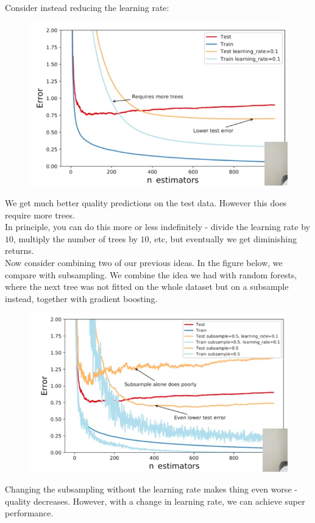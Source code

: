 \begin{frameex}
\newpage
Consider instead reducing the learning rate:
\begin{figure}[H]
\centering
\includegraphics[scale=0.4]{testtrainlearningrate.png}
\end{figure}
We get much better quality predictions on the test data. However this does require more trees.\\

In principle, you can do this more or less indefinitely - divide the learning rate by $10$, multiply the number of trees by $10$, etc, but eventually we get diminishing returns.\\

Now consider combining two of our previous ideas. In the figure below, we compare with subsampling. We combine the idea we had with random forests, where the next tree was not fitted on the whole dataset but on a subsample instead, together with gradient boosting.
\begin{figure}[H]
\centering
\includegraphics[scale=0.4]{testtrainsamplelearningrate.png}
\end{figure}
Changing the subsampling without the learning rate makes thing even worse - quality decreases. However, with a change in learning rate, we can achieve super performance.
\end{frameex}




